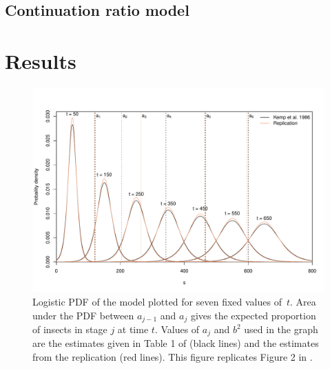 \citet{dennis1986stochastic}

\subsection{Continuation ratio model}

\section{Results}
\begin{figure}[p]
  \centering
  \includegraphics[width=\textwidth]{../figures/dennis_fig2.pdf}
  \caption{Logistic PDF of the \citet{dennis1986stochastic} model plotted for seven fixed values of~$t$. Area under the PDF between $a_{j-1}$ and $a_j$ gives the expected proportion of insects in stage $j$ at time $t$. Values of $a_j$ and $b^2$ used in the graph are the estimates given in Table 1 of \citep{kemp1986stochastic} (black lines) and the estimates from the replication (red lines). This figure replicates Figure 2 in \citep{dennis1986stochastic}.}
  \label{fig:fig1}
\end{figure}

